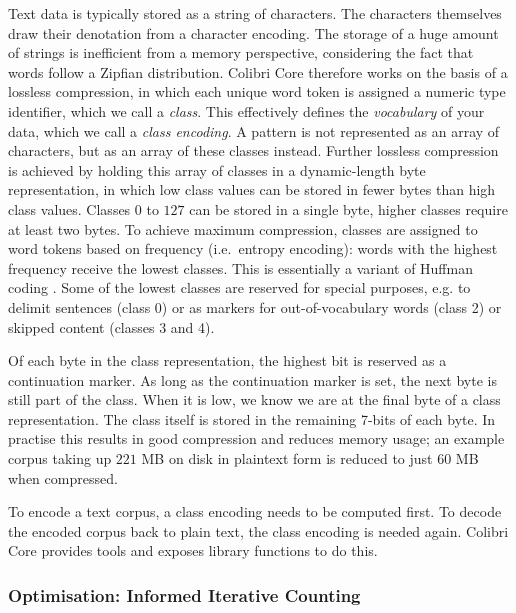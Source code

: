 \documentclass[a4paper,12pt]{article}
\begin{document}
Text data is typically stored as a string of characters. The characters
themselves draw their denotation from a character encoding. The storage of a
huge amount of strings is inefficient from a memory perspective, considering
the fact that words follow a Zipfian distribution. Colibri Core therefore works
on the basis of a lossless compression, in which each unique word token is
assigned a numeric type identifier, which we call a \emph{class}. This
effectively defines the \emph{vocabulary} of your data, which we call a
\emph{class encoding}. A pattern is not represented as an array of
characters, but as an array of these classes instead. Further lossless
compression is achieved by holding this array of classes in a dynamic-length
byte representation, in which low class values can be stored in fewer bytes
than high class values. Classes $0$ to $127$ can be stored in a single byte,
higher classes require at least two bytes. To achieve maximum compression,
classes are assigned to word tokens based on frequency (i.e.\ entropy
encoding): words with the highest frequency receive the lowest classes.  This
is essentially a variant of Huffman coding \citep{HUFFMAN}. Some of the lowest
classes are reserved for special purposes, e.g. to delimit sentences (class 0) or as
markers for out-of-vocabulary words (class 2) or skipped content (classes 3 and 4).

Of each byte in the class representation, the highest bit is reserved as a continuation
marker. As long as the continuation marker is set, the next byte is still part of
the class. When it is low, we know we are at the final byte of a class
representation. The class itself is stored in the remaining 7-bits of each
byte. In practise this results in good compression and reduces memory usage; an
example corpus taking up $221$ MB on disk in plaintext form is reduced to just $60$ MB
when compressed.

To encode a text corpus, a class encoding needs to be computed first. To decode
the encoded corpus back to plain text, the class encoding is needed again.
Colibri Core provides tools and exposes library functions to do this.

\subsubsection{Optimisation: Informed Iterative Counting}
\label{sec:iterativecounting}
\end{document}
